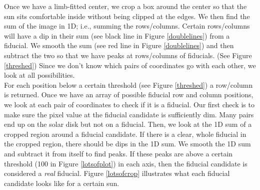 \documentclass[10pt]{scrartcl}
\begin{document}

Once we have a limb-fitted center, we crop a box around the center so that the sun sits comfortable inside without being clipped at the edges. We then find the sum of the image in 1D; i.e., summing the rows/columns. Certain rows/columns will have a dip in their sum (see black line in Figure \ref{doublelines}) from a fiducial. We smooth the sum (see red line in Figure \ref{doublelines}) and then subtract the two so that we have peaks at rows/columns of fiducials. (See Figure \ref{threshed}) Since we don't know which pairs of coordinates go with each other, we look at all possibilities. \\

For each position below a certain threshold (see Figure \ref{threshed}) a row/column  is returned. Once we have an array of possible fiducial row and column positions, we look at each pair of coordinates to check if it is a fiducial. Our first check is to make sure the pixel value at the fiducial candidate is sufficiently dim. Many pairs end up on the solar disk but not on a fiducial. Then, we look at the 1D sum of a cropped region around a fiducial candidate. If there is a clear, whole fiducial in the cropped region, there should be dips in the 1D sum. We smooth the 1D sum and subtract it from itself to find peaks. If these peaks are above a certain threshold (100 in Figure \ref{lotsofplot}) in each axis, then the fiducial candidate is considered a \emph{real} fiducial. Figure \ref{lotsofcrop} illustrates what each fiducial candidate looks like for a certain sun. 
\end{document}
